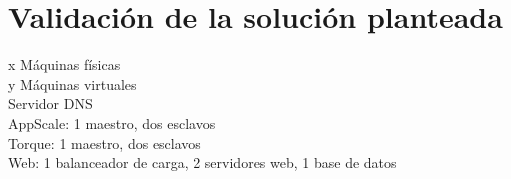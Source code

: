 \chapter{Validación de la solución planteada}
\label{cap:validacion}

x Máquinas físicas\\
y Máquinas virtuales\\
Servidor DNS\\
AppScale: 1 maestro, dos esclavos\\
Torque: 1 maestro, dos esclavos\\
Web: 1 balanceador de carga, 2 servidores web, 1 base de datos\\
